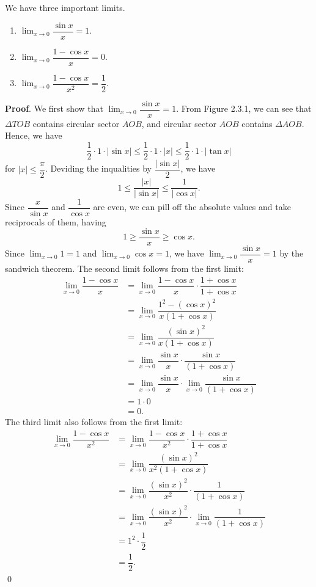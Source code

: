 \documentclass[11pt]{book}
\theoremstyle{break}
\theoremstyle{no_label}
\numberwithin{equation}{section}
\begin{document}
\begin{theorem}
    We have three important limits.
    \begin{enumerate}
        \item $\displaystyle\lim_{x\to 0}\dfrac{\sin x}{x}=1$.
        \item $\displaystyle\lim_{x\to 0}\dfrac{1-\cos x}{x}=0$.
        \item $\displaystyle\lim_{x\to 0}\dfrac{1-\cos x}{x^2}=\dfrac{1}{2}$.
    \end{enumerate}
\end{theorem}
\textbf{Proof}. We first show that $\displaystyle\lim_{x\to 0}\dfrac{\sin x}{x}=1$. From Figure 2.3.1, we can see that $\Delta TOB$ contains circular sector $AOB$, and circular sector $AOB$ contains $\Delta AOB$. Hence, we have $$\dfrac{1}{2}\cdot1\cdot |\sin x|\leq\dfrac{1}{2}\cdot1\cdot|x|\leq\dfrac{1}{2}\cdot 1\cdot |\tan x|$$ for $|x|\leq\dfrac{\pi}{2}$. Deviding the inqualities by $\dfrac{|\sin x|}{2}$, we have $$1\leq\dfrac{|x|}{|\sin x|}\leq\dfrac{1}{|\cos x|}.$$ Since $\dfrac{x}{\sin x}$ and $\dfrac{1}{\cos x}$ are even, we can pill off the absolute values and take reciprocals of them, having $$1\geq\dfrac{\sin x}{x}\geq\cos x.$$ Since $\displaystyle\lim_{x\to 0}1=1$ and $\displaystyle\lim_{x\to 0}\cos x=1$, we have $\displaystyle\lim_{x\to 0}\dfrac{\sin x}{x}=1$ by the sandwich theorem. The second limit follows from the first limit:
\begin{align*}
    \lim_{x\to 0}\dfrac{1-\cos x}{x}&=\lim_{x\to 0}\dfrac{1-\cos x}{x}\cdot\dfrac{1+\cos x}{1+\cos x}\\
    &=\lim_{x\to 0}\dfrac{1^2-(\cos x)^2}{x(1+\cos x)}\\
    &=\lim_{x\to 0}\dfrac{(\sin x)^2}{x(1+\cos x)}\\
    &=\lim_{x\to 0}\dfrac{\sin x}{x}\cdot\dfrac{\sin x}{(1+\cos x)}\\
    &=\lim_{x\to 0}\dfrac{\sin x}{x}\cdot\lim_{x\to 0}\dfrac{\sin x}{(1+\cos x)}\\
    &=1\cdot0\\
    &=0.
\end{align*} The third limit also follows from the first limit: \begin{align*}
    \lim_{x\to 0}\dfrac{1-\cos x}{x^2}&=\lim_{x\to 0}\dfrac{1-\cos x}{x^2}\cdot\dfrac{1+\cos x}{1+\cos x}\\
    &=\lim_{x\to 0}\dfrac{(\sin x)^2}{x^2(1+\cos x)}\\
    &=\lim_{x\to 0}\dfrac{(\sin x)^2}{x^2}\cdot\dfrac{1}{(1+\cos x)}\\
    &=\lim_{x\to 0}\dfrac{(\sin x)^2}{x^2}\cdot\lim_{x\to 0}\dfrac{1}{(1+\cos x)}\\
    &=1^2\cdot\dfrac{1}{2}\\
    &=\dfrac{1}{2}.
\end{align*} \qed
\end{document}

